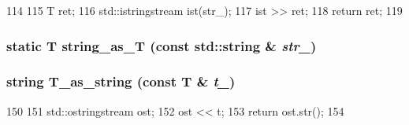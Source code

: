\begin{DoxyCode}
114 {
115     T ret;
116     std::istringstream ist(str_);
117     ist >> ret;
118     return ret;
119 }
\end{DoxyCode}
\hypertarget{classOrionConfig_a081922371e67d6407856e275638a6c47}{
\subsubsection[{string\_\-as\_\-T}]{\setlength{\rightskip}{0pt plus 5cm}static T string\_\-as\_\-T (const std::string \& {\em str\_\-})}}
\label{classOrionConfig_a081922371e67d6407856e275638a6c47}
\hypertarget{classOrionConfig_aaf412122e8782f01e0e93132bce00b17}{
\subsubsection[{T\_\-as\_\-string}]{\setlength{\rightskip}{0pt plus 5cm}string T\_\-as\_\-string (const T \& {\em t\_\-})}}
\label{classOrionConfig_aaf412122e8782f01e0e93132bce00b17}



\begin{DoxyCode}
150 {
151     std::ostringstream ost;
152     ost << t;
153     return ost.str();
154 }
\end{DoxyCode}


